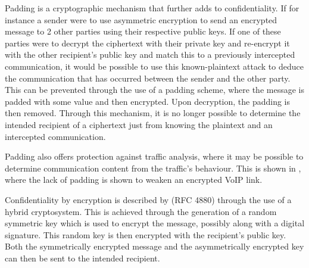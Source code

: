 		Padding is a cryptographic mechanism that further adds to confidentiality. If for instance a sender were to use asymmetric encryption to send an encrypted message to 2 other parties using their respective public keys. If one of these parties were to decrypt the ciphertext with their private key and re-encrypt it with the other recipient's public key and match this to a previously intercepted communication, it would be possible to use this known-plaintext attack to deduce the communication that has occurred between the sender and the other party. This can be prevented through the use of a padding scheme, where the message is padded with some value and then encrypted. Upon decryption, the padding is then removed. Through this mechanism, it is no longer possible to determine the intended recipient of a ciphertext just from knowing the plaintext and an intercepted communication.
		
		Padding also offers protection against traffic analysis, where it may be possible to determine communication content from the traffic's behaviour. This is shown in \cite{Wright:2010:USP:1880022.1880029}, where the lack of padding is shown to weaken an encrypted VoIP link.
	
		Confidentiality by encryption is described by (RFC 4880)  through the use of a hybrid cryptosystem. This is achieved through the generation of a random symmetric key which is used to encrypt the message, possibly along with a digital signature. This random key is then encrypted with the recipient's public key. Both the symmetrically encrypted message and the asymmetrically encrypted key can then be sent to the intended recipient.
